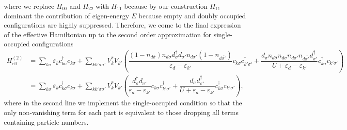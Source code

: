 \documentclass[aps,prx,superscriptaddress,onecolumn,preprintnumbers,nofootinbib,longbibliography]{revtex4-1}
\begin{document}
		where we replace $H_{00}$ and $H_{22}$ with $H_{11}$ because by our construction $H_{11}$ dominant the contribution of eigen-energy $E$ because empty and doubly occupied configurations are highly suppressed. Therefore, we come to the final expression of the effective Hamiltonian up to the second order approximation for single-occupied configurations
		\begin{align}
			H_{\text{eff}}^{(2)}&=\sum_{k \sigma}\varepsilon_k c_{k \sigma}^\dagger c_{k \sigma}+\sum_{kk' \sigma\sigma'}V_k^*V_{k'}\left(\dfrac{(1-n_{d\bar{\sigma}})n_{d\sigma}d_\sigma^\dagger d_{\sigma'}n_{d\sigma'}(1-n_{d\bar{\sigma'}})}{\varepsilon_d- \varepsilon_{k'}}c_{k \sigma}c_{k'\sigma'}^\dagger+\dfrac{d_\sigma n_{d\bar{\sigma}}n_{d\sigma}n_{d\sigma'} n_{d\bar{\sigma'}}d_{\sigma'}^\dagger}{U+\varepsilon_d- \varepsilon_{k'}}c_{k \sigma}^\dagger c_{k'\sigma'}\right)\nonumber\\
			&=\sum_{k \sigma}\varepsilon_k c_{k \sigma}^\dagger c_{k \sigma}+\sum_{kk' \sigma\sigma'}V_k^*V_{k'}\left(\dfrac{d_\sigma^\dagger d_{\sigma'}}{\varepsilon_d- \varepsilon_{k'}}c_{k \sigma}c_{k'\sigma'}^\dagger+\dfrac{d_\sigma d_{\sigma'}^\dagger}{U+\varepsilon_d- \varepsilon_{k'}}c_{k \sigma}^\dagger c_{k'\sigma'}\right),\label{1.2.11}
		\end{align}
		where in the second line we implement the single-occupied condition so that the only non-vanishing term for each part is equivalent to those dropping all terms containing particle numbers.
\end{document}
